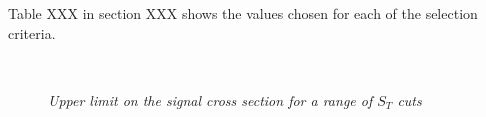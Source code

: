 Table XXX in section XXX shows the values chosen for each of the selection criteria.  

\begin{figure}[htbp]
  \begin{center}
       \\
    \caption{\small \sl Upper limit on the signal cross section for a range of $S_T$ cuts }
    \label{fig:optimization}
  \end{center}
\end{figure}

%
